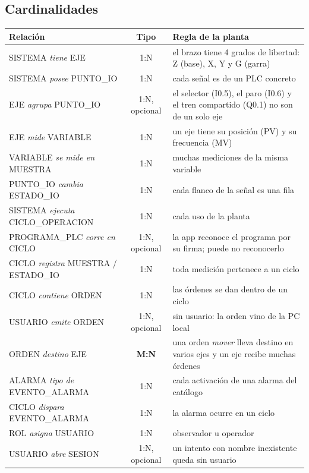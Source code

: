 \documentclass[a4paper,11pt]{article}
\begin{document}
\subsection{Cardinalidades}
\begin{center}\small
\begin{tabularx}{\linewidth}{>{\raggedright}p{6.2cm} c >{\raggedright\arraybackslash}X}
\toprule
\textbf{Relación} & \textbf{Tipo} & \textbf{Regla de la planta}\\
\midrule
SISTEMA \emph{tiene} EJE & 1:N & el brazo tiene 4 grados de libertad: Z (base), X, Y y G (garra)\\
SISTEMA \emph{posee} PUNTO\_IO & 1:N & cada señal es de un PLC concreto\\
EJE \emph{agrupa} PUNTO\_IO & 1:N, opcional & el selector (I0.5), el paro (I0.6) y el tren compartido (Q0.1) no son de un solo eje\\
EJE \emph{mide} VARIABLE & 1:N & un eje tiene su posición (PV) y su frecuencia (MV)\\
VARIABLE \emph{se mide en} MUESTRA & 1:N & muchas mediciones de la misma variable\\
PUNTO\_IO \emph{cambia} ESTADO\_IO & 1:N & cada flanco de la señal es una fila\\
SISTEMA \emph{ejecuta} CICLO\_OPERACION & 1:N & cada uso de la planta\\
PROGRAMA\_PLC \emph{corre en} CICLO & 1:N, opcional & la app reconoce el programa por su firma; puede no reconocerlo\\
CICLO \emph{registra} MUESTRA / ESTADO\_IO & 1:N & toda medición pertenece a un ciclo\\
CICLO \emph{contiene} ORDEN & 1:N & las órdenes se dan dentro de un ciclo\\
USUARIO \emph{emite} ORDEN & 1:N, opcional & sin usuario: la orden vino de la PC local\\
ORDEN \emph{destino} EJE & \textbf{M:N} & una orden \emph{mover} lleva destino en varios ejes y un eje recibe muchas órdenes\\
ALARMA \emph{tipo de} EVENTO\_ALARMA & 1:N & cada activación de una alarma del catálogo\\
CICLO \emph{dispara} EVENTO\_ALARMA & 1:N & la alarma ocurre en un ciclo\\
ROL \emph{asigna} USUARIO & 1:N & observador u operador\\
USUARIO \emph{abre} SESION & 1:N, opcional & un intento con nombre inexistente queda sin usuario\\
\bottomrule
\end{tabularx}
\end{center}
\end{document}
